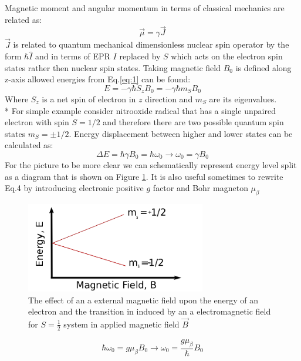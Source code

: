Magnetic moment and angular momentum in terms of classical mechanics are related as: 
\begin{equation}\label{eq:2}
\vec{\mu}=\gamma \vec{J}
\end{equation}
$\vec{J}$ is related to quantum mechanical dimensionless nuclear spin operator by the form $\hbar\hat{I}$ and in terms of EPR $I$ replaced by $S$ which acts on the electron spin states rather then nuclear spin states. Taking magnetic field $B_0$ is defined along z-axis allowed energies from Eq.\ref{eq:1} can be found:
\begin{equation}\label{eq:3}
E=-\gamma\hbar S_z B_0=-\gamma\hbar m_S B_0
\end{equation} 
Where $S_z$ is a net spin of electron in $z$ direction and $m_S$ are its eigenvalues. \\*
For simple example consider nitrooxide radical that has a single unpaired electron with spin $S=1/2$ and therefore there are two possible quantum spin states $m_S=\pm1/2$. Energy displacement between higher and lower states can be calculated as:
\begin{equation}\label{eq:4}
\Delta E=\hbar \gamma B_0=\hbar \omega_0 \rightarrow \omega_0=\gamma B_0
\end{equation} 
For the picture to be more clear we can schematically represent energy level split as a diagram that is shown on Figure \ref{figure:zeeman}. It is also useful sometimes to rewrite Eq.4 by introducing electronic positive $g$ factor and Bohr magneton $\mu_{\beta}$  
\begin{figure}[h!]
\begin{center}
\includegraphics[width=0.7\textwidth]{figures/chap1/zems.png}
\caption{The effect of an a external magnetic field upon the energy of an electron and
the transition in induced by an a electromagnetic field for $S=\frac{1}{2}$ system in applied magnetic field $\vec B$}
\label{figure:zeeman}
\end{center}
\end{figure}
\begin{equation}\label{eq:5}
\hbar \omega_0=g\mu_{\beta}B_0 \rightarrow \omega_0=\frac{g\mu_{\beta}}{\hbar}B_0
\end{equation} 
